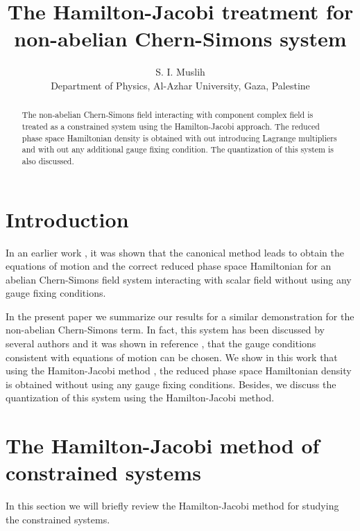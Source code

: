 \documentclass[a4paper,12pt]{article}
\begin{document}
\title{The Hamilton-Jacobi treatment for non-abelian Chern-Simons
system}\maketitle
\begin{center}
\author{S. I. Muslih\\{Department of Physics,
Al-Azhar University, Gaza, Palestine}}
\end{center}
\begin{abstract}
The non-abelian Chern-Simons field interacting with \coordHE{} component
complex field is treated as a constrained system using the
Hamilton-Jacobi approach. The reduced phase space Hamiltonian
density is obtained with out introducing Lagrange multipliers and
with out any additional gauge fixing condition. The quantization
of this system is also discussed.
\end{abstract}
\newpage
\setcounter{section}{0}

\section{Introduction}

 In an earlier work \cite{sm1}, it was shown that the canonical method \cite{sm2,gl} leads  to obtain the equations of
motion and the correct reduced phase space Hamiltonian for an
abelian Chern-Simons field system interacting with scalar field
without using any gauge fixing conditions.

In the present paper we summarize our results for a similar
demonstration for the non-abelian Chern-Simons term. In fact,
this system has been discussed by several authors
\cite{fer,des,shar} and it was shown in reference \cite{shar},
that the gauge conditions consistent with equations of motion can
be chosen. We show in this work that using the Hamiton-Jacobi
method \cite{sm2,gl}, the reduced phase space Hamiltonian density
is obtained without using any gauge fixing conditions. Besides, we
discuss the quantization of this system using the Hamilton-Jacobi
method.

\section{The Hamilton-Jacobi method of constrained systems}
In this section we will briefly review the Hamilton-Jacobi
method  \cite{sm2,gl} for studying the constrained systems.
\end{document}
